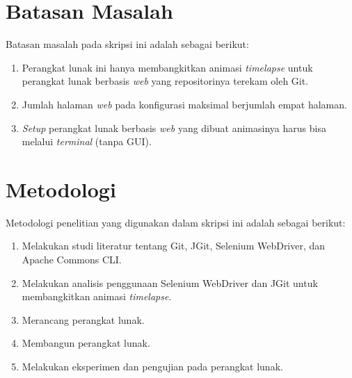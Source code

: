 \section{Batasan Masalah}
\label{sec:batasan}
Batasan masalah pada skripsi ini adalah sebagai berikut:
\begin{enumerate}
		\item Perangkat lunak ini hanya membangkitkan animasi \textit{timelapse} untuk perangkat lunak berbasis \textit{web} yang repositorinya terekam oleh Git. 
	    \item Jumlah halaman \textit{web} pada konfigurasi maksimal berjumlah empat halaman.
	    \item \textit{Setup} perangkat lunak berbasis \textit{web} yang dibuat animasinya harus bisa  melalui \textit{terminal} (tanpa GUI).
\end{enumerate}
\section{Metodologi}
\label{sec:metlit}
Metodologi penelitian yang digunakan dalam skripsi ini adalah sebagai berikut:
\begin{enumerate}
		\item Melakukan studi literatur tentang Git, JGit, Selenium WebDriver, dan Apache Commons CLI.
		\item Melakukan analisis penggunaan Selenium WebDriver dan JGit untuk membangkitkan animasi \textit{timelapse}.
		\item Merancang perangkat lunak.
		\item Membangun perangkat lunak.
		\item Melakukan eksperimen dan pengujian pada perangkat lunak.
	\end{enumerate}

